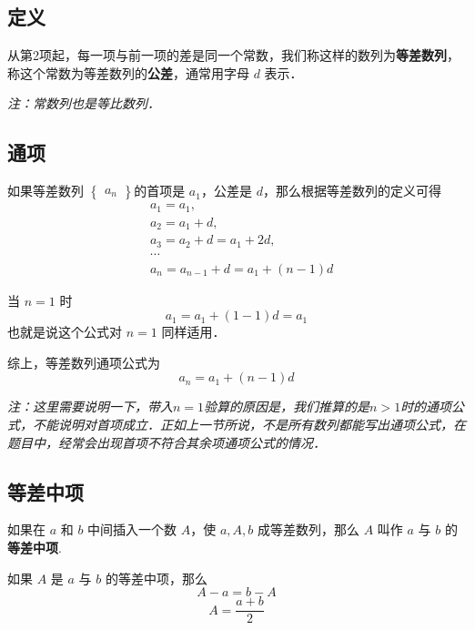
\subsection{定义}
从第2项起，每一项与前一项的差是同一个常数，我们称这样的数列为\textbf{等差数列}，称这个常数为等差数列的\textbf{公差}，通常用字母 $d$ 表示．

\textsl{注：常数列也是等比数列．}

\subsection{通项}
如果等差数列 $\begin{Bmatrix} a_n \end{Bmatrix}$的首项是 $a_1$，公差是 $d$，那么根据等差数列的定义可得
\begin{equation}
\begin{aligned}
&a_1 = a_1,\\
&a_2 = a_1 + d,\\
&a_3 = a_2 + d = a_1 + 2d,\\
&\cdots \\
&a_n = a_{n-1} + d = a_1 + (n - 1)d
\end{aligned}
\end{equation}

当 $n = 1$ 时
\begin{equation}
a_1 = a_1 + (1 - 1)d = a_1
\end{equation}
也就是说这个公式对 $n = 1$ 同样适用．

综上，等差数列通项公式为
\begin{equation}
a_n = a_1 + (n - 1)d
\end{equation}

\textsl{注：这里需要说明一下，带入$n = 1$验算的原因是，我们推算的是$n > 1$时的通项公式，不能说明对首项成立．正如上一节所说，不是所有数列都能写出通项公式，在题目中，经常会出现首项不符合其余项通项公式的情况．}

\subsection{等差中项}
如果在 $a$ 和 $b$ 中间插入一个数 $A$，使 $a,A,b$ 成等差数列，那么 $A$ 叫作 $a$ 与 $b$ 的\textbf{等差中项}.

如果 $A$ 是 $a$ 与 $b$ 的等差中项，那么
\begin{equation}
A - a = b - A
\end{equation}
\begin{equation}
A = \frac{a+b}{2}
\end{equation}

